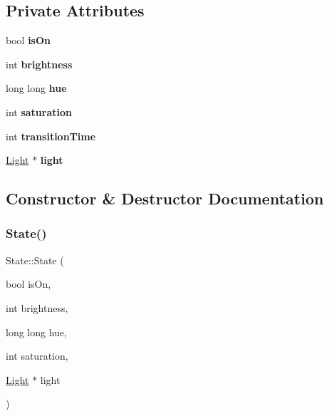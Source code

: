 \subsection*{Private Attributes}
\begin{DoxyCompactItemize}
\item 
\mbox{\label{class_state_a6cd3b811f48e75ae37dde9f42949de67}} 
bool {\bfseries is\+On}
\item 
\mbox{\label{class_state_a1fb6bd9d8359bc551391e5398971837a}} 
int {\bfseries brightness}
\item 
\mbox{\label{class_state_a6d74abf435accde10ab4c74a7e8f28f9}} 
long long {\bfseries hue}
\item 
\mbox{\label{class_state_a1493b952db8842ab3c4d77841ab47da0}} 
int {\bfseries saturation}
\item 
\mbox{\label{class_state_a01b875b15cf0202c425b783f23c9f1bf}} 
int {\bfseries transition\+Time}
\item 
\mbox{\label{class_state_a2faa32b12d21fdd7dff98809763cc120}} 
\hyperlink{class_light}{Light} $\ast$ {\bfseries light}
\end{DoxyCompactItemize}


\subsection{Constructor \& Destructor Documentation}
\mbox{\label{class_state_a5e37ff8935f49ac28c0d0faeae304c8e}} 
\subsubsection{\texorpdfstring{State()}{State()}}
{\footnotesize\ttfamily State\+::\+State (\begin{DoxyParamCaption}\item[{bool}]{is\+On,  }\item[{int}]{brightness,  }\item[{long long}]{hue,  }\item[{int}]{saturation,  }\item[{\hyperlink{class_light}{Light} $\ast$}]{light }\end{DoxyParamCaption})}



